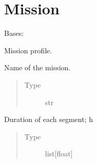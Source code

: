 \documentclass[letterpaper,10pt,english]{sphinxmanual}
\begin{document}
\section{Mission}
\label{\detokenize{modules/mission:module-mission}}\label{\detokenize{modules/mission:mission}}\label{\detokenize{modules/mission::doc}}

\begin{fulllineitems}
\label{\detokenize{modules/mission:mission.Mission}}
\sphinxAtStartPar
Bases: 

\sphinxAtStartPar
Mission profile.

\begin{fulllineitems}
\label{\detokenize{modules/mission:mission.Mission.name}}
\sphinxAtStartPar
Name of the mission.
\begin{quote}\begin{description}
\item[{Type}] \leavevmode
\sphinxAtStartPar
str

\end{description}\end{quote}

\end{fulllineitems}


\begin{fulllineitems}
\label{\detokenize{modules/mission:mission.Mission.duration}}
\sphinxAtStartPar
Duration of each segment; h
\begin{quote}\begin{description}
\item[{Type}] \leavevmode
\sphinxAtStartPar
list{[}float{]}

\end{description}\end{quote}


\end{fulllineitems}
\end{fulllineitems}
\end{document}
